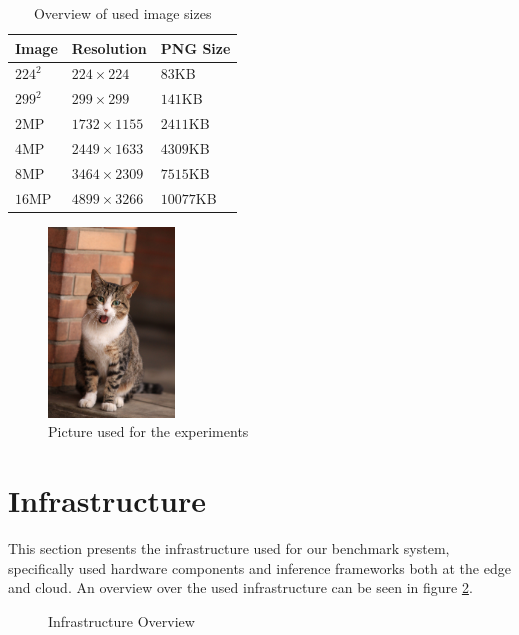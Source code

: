 \begin{table}[!htb]
\centering
\caption{Overview of used image sizes}
\label{table:imagesOverview}
\begin{tabular}{@{}lll@{}}
\toprule
Image   & Resolution       & PNG Size  \\ \midrule
$224^2$ & $224\times224$   & $83$KB    \\
$299^2$ & $299\times299$   & $141$KB   \\
$2$MP   & $1732\times1155$ & $2411$KB  \\
$4$MP   & $2449\times1633$ & $4309$KB  \\
$8$MP   & $3464\times2309$ & $7515$KB  \\
$16$MP  & $4899\times3266$ & $10077$KB \\ \bottomrule
\end{tabular}
\end{table}
\begin{figure}[!htb]
\centering
\includegraphics[width=0.3\textwidth]{./Bilder/European_cat_compressed.jpg}
\caption{Picture used for the experiments \cite{cat}}
\label{fig:cat}
\end{figure}


\section{Infrastructure}
\label{chap:infrastructure}
This section presents the infrastructure used for our benchmark system, specifically used hardware components and inference frameworks both at the edge and cloud.
An overview over the used infrastructure can be seen in figure \ref{fig:expDesign}.

\begin{figure}[H]
\centering
\resizebox{.95\linewidth}{!}{}
\caption{Infrastructure Overview}
\label{fig:expDesign}
\end{figure}


